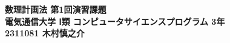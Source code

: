 \documentclass[uplatex,dvipdfmx,a4paper,10pt]{jsarticle}
\theoremstyle{definition}
\begin{document}
\begin{center}
{\Large{\bf 数理計画法 第1回演習課題}} \\
{\bf 電気通信大学 Ⅰ類 コンピュータサイエンスプログラム 3年} \\
{\bf 2311081 木村慎之介} \\
\end{center}






\appendix
\setcounter{figure}{0}
\setcounter{table}{0}
\renewcommand{\thetable}{\Alph{section}\arabic{table}}
\renewcommand{\thefigure}{\Alph{section}\arabic{figure}}
\makeatletter 
\newcommand{\section@cntformat}{付録 \thesection:\ }
\makeatother

    
\end{document}

